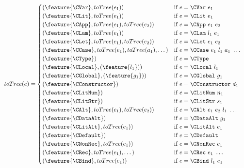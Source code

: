 \begin{figure}
  \begin{align*}\label{fig:totree}
    toTree(e) &=
    \begin{cases}
      (\feature{\CVar},     toTree(e_1))                                 & \text{if $e = \CVar\ e_1$} \\
      (\feature{\CLit},     toTree(e_1))                                 & \text{if $e = \CLit\ e_1$} \\
      (\feature{\CApp},     toTree(e_1), toTree(e_2))                    & \text{if $e = \CApp\ e_1\ e_2$} \\
      (\feature{\CLam},     toTree(e_1))                                 & \text{if $e = \CLam\ l_1\ e_1$} \\
      (\feature{\CLet},     toTree(e_1), toTree(e_2))                    & \text{if $e = \CLet\ e_1\ e_2$} \\
      (\feature{\CCase},    toTree(e_1), toTree(a_1), \dots)             & \text{if $e = \CCase\ e_1\ l_1\ a_1\ \dots$} \\
      (\feature{\CType})                                                & \text{if $e = \CType$} \\
      (\feature{\CLocal},   (\feature{l_1}))                            & \text{if $e = \CLocal\ l_1$} \\
      (\feature{\CGlobal},  (\feature{g_1}))                            & \text{if $e = \CGlobal\ g_1$} \\
      (\feature{\CConstructor})                                         & \text{if $e = \CConstructor\ d_1$} \\
      (\feature{\CLitNum})                                              & \text{if $e = \CLitNum\ n_1$} \\
      (\feature{\CLitStr})                                              & \text{if $e = \CLitStr\ s_1$} \\
      (\feature{\CAlt},     toTree(e_1), toTree(e_2))                   & \text{if $e = \CAlt\ e_1\ e_2\ l_1\ \dots$}  \\
      (\feature{\CDataAlt})                                             & \text{if $e = \CDataAlt\ g_1$}  \\
      (\feature{\CLitAlt},  toTree(e_1))                                & \text{if $e = \CLitAlt\ e_1$}  \\
      (\feature{\CDefault})                                             & \text{if $e = \CDefault$}  \\
      (\feature{\CNonRec},  toTree(e_1))                                & \text{if $e = \CNonRec\ e_1$}  \\
      (\feature{\CRec},     toTree(e_1), \dots)                         & \text{if $e = \CRec\ e_1\ \dots$} \\
      (\feature{\CBind},    toTree(e_1))                                & \text{if $e = \CBind\ l_1\ e_1$}
    \end{cases}
  \end{align*}
\end{figure}

